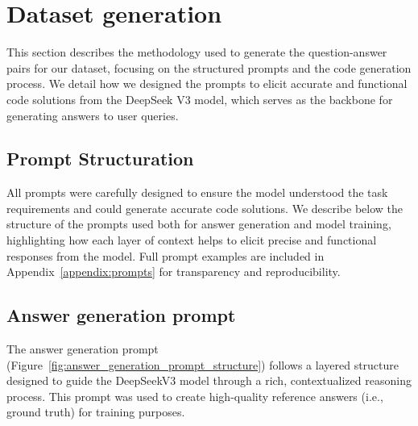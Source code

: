 


\section{Dataset generation}

This section describes the methodology used to generate the question-answer pairs for our dataset, focusing on the structured prompts and the code generation process. We detail how we designed the prompts to elicit accurate and functional code solutions from the DeepSeek V3 model, which serves as the backbone for generating answers to user queries.

\subsection{Prompt Structuration}

All prompts were carefully designed to ensure the model understood the task requirements and could generate accurate code solutions. We describe below the structure of the prompts used both for answer generation and model training, highlighting how each layer of context helps to elicit precise and functional responses from the model. Full prompt examples are included in Appendix~\ref{appendix:prompts} for transparency and reproducibility.

\subsection{Answer generation prompt}

The answer generation prompt (Figure~\ref{fig:answer_generation_prompt_structure}) follows a layered structure designed to guide the DeepSeekV3 model through a rich, contextualized reasoning process. This prompt was used to create high-quality reference answers (i.e., ground truth) for training purposes.

